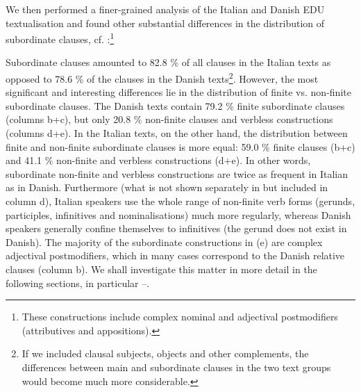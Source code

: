 \documentclass[output=paper]{LSP/langsci}
\begin{document}
We then performed a finer-grained analysis of the Italian and Danish EDU textualisation and found other substantial differences in the distribution of subordinate clauses, cf. :\footnote{These constructions include complex nominal and adjectival postmodifiers (attributives and appositions).}

\begin{table}[t]
\caption{Distribution of EDUs in subordinate clauses in Europarl subcorpus 2.}
\label{tab:korzen:5}
\end{table}


Subordinate clauses amounted to 82.8 \% of all clauses in the Italian texts as opposed to 78.6 \% of the clauses in the Danish texts\footnote{If we included clausal subjects, objects and other complements, the differences between main and subordinate clauses in the two text groups would become much more considerable.}. However, the most significant and interesting differences lie in the distribution of finite vs. non-finite subordinate clauses. The Danish texts contain 79.2 \% finite subordinate clauses (columns b+c), but only 20.8 \% non-finite clauses and verbless constructions (columns d+e). In the Italian texts, on the other hand, the distribution between finite and non-finite subordinate clauses is more equal:  59.0 \% finite clauses (b+c) and 41.1 \% non-finite and verbless constructions (d+e). In other words, subordinate non-finite and verbless constructions are twice as frequent in Italian as in Danish. Furthermore (what is not shown separately in  but included in column d), Italian speakers use the whole range of non-finite verb forms (gerunds, participles, infinitives and nominalisations) much more regularly, whereas Danish speakers generally confine themselves to infinitives (the gerund does not exist in Danish). The majority of the subordinate constructions in (e) are complex adjectival postmodifiers, which in many cases correspond to the Danish relative clauses (column b). We shall investigate this matter in more detail in the following sections, in particular --.
\end{document}
